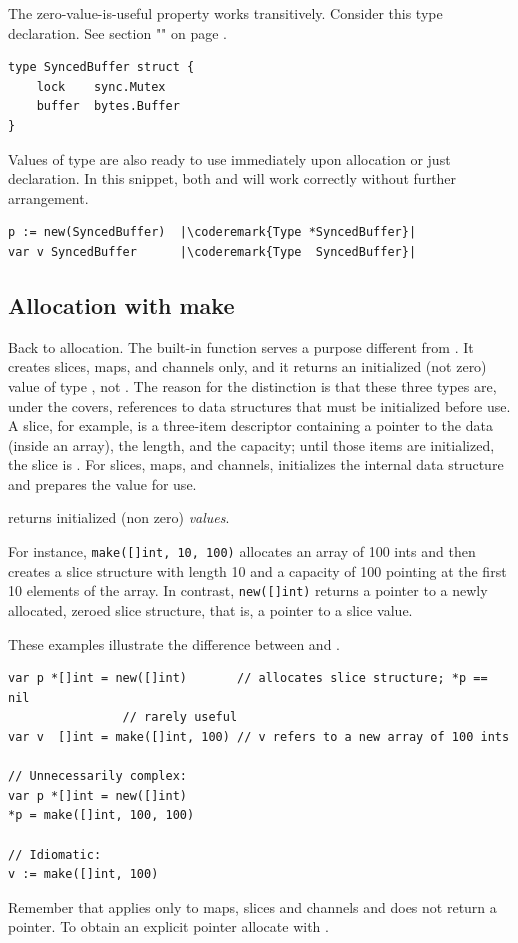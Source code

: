 The zero-value-is-useful property works transitively. Consider this type
declaration. See section "" on page
\pageref{sec:defining your own}.

\begin{lstlisting}
type SyncedBuffer struct {
    lock    sync.Mutex
    buffer  bytes.Buffer
}
\end{lstlisting}
Values of type  are also ready to use immediately upon
allocation or just declaration. In this snippet, both  and
 will work
correctly without further arrangement.
\begin{lstlisting}
p := new(SyncedBuffer)  |\coderemark{Type *SyncedBuffer}|
var v SyncedBuffer      |\coderemark{Type  SyncedBuffer}|
\end{lstlisting}

\subsection{Allocation with make}
\label{sec:allocation with make}
Back to allocation. The built-in function  serves a purpose
different from . It creates slices, maps, and channels only, and
it returns an initialized (not zero) value of type , not
. The reason
for the distinction is that these three types are, under the covers,
references to data structures that must be initialized before use. A
slice, for example, is a three-item descriptor containing a pointer to
the data (inside an array), the length, and the capacity; until those
items are initialized, the slice is . For slices, maps, and channels,
 initializes the internal data structure and prepares the value for
use. 

\begin{lbar}
 returns initialized (non zero) \emph{values}.
\end{lbar}

For instance,
\lstinline{make([]int, 10, 100)}
allocates an array of 100 ints and then creates a slice structure with
length 10 and a capacity of 100 pointing at the first 10 elements of the
array. In contrast,
\lstinline{new([]int)} returns
a pointer to a newly allocated, zeroed slice structure, that is, a
pointer to a  slice value.

These examples illustrate the difference between  and
.
\begin{lstlisting}
var p *[]int = new([]int)       // allocates slice structure; *p == nil
				// rarely useful
var v  []int = make([]int, 100) // v refers to a new array of 100 ints

// Unnecessarily complex:
var p *[]int = new([]int)
*p = make([]int, 100, 100)

// Idiomatic:
v := make([]int, 100)
\end{lstlisting}
Remember that  applies only to maps, slices and channels and does
not return a pointer. To obtain an explicit pointer allocate with
.

